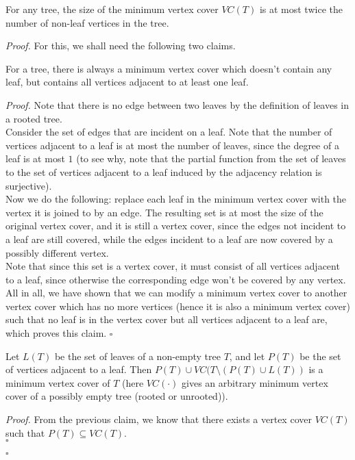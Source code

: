 \documentclass[a4paper]{article}
\newenvironment{proof}{\begin{breakbox}\textit{Proof.}}{\hfill$\square$\end{breakbox}}
\newcommand{\nl}{\vspace{0.2cm}\\}
\begin{document}
\begin{claim}
    For any tree, the size of the minimum vertex cover $VC(T)$ is at most twice the number of non-leaf vertices in the tree.
\end{claim}
\begin{proof}
    For this, we shall need the following two claims.\nl
    \begin{claim}
        For a tree, there is always a minimum vertex cover which doesn't contain any leaf, but contains all vertices adjacent to at least one leaf.
    \end{claim}
    \begin{proof}
        Note that there is no edge between two leaves by the definition of leaves in a rooted tree.\nl
        Consider the set of edges that are incident on a leaf.
        Note that the number of vertices adjacent to a leaf is at most the number of leaves, since the degree of a leaf is at most $1$ (to see why, note that the partial function from the set of
        leaves to the set of vertices adjacent to a leaf induced by the adjacency relation is surjective).\nl
        Now we do the following: replace each leaf in the minimum vertex cover with the vertex it is joined to by an edge. The resulting set is at most the size of the original vertex cover,
        and it is still a vertex cover, since the edges not incident to a leaf are still covered, while the edges incident to a leaf are now covered by a possibly different vertex.\nl
        Note that since this set is a vertex cover, it must consist of all vertices adjacent to a leaf, since otherwise the corresponding edge won't be covered by any vertex.\nl
        All in all, we have shown that we can modify a minimum vertex cover to another vertex cover which has no more vertices (hence it is also a minimum vertex cover) such that no leaf is in the
        vertex cover but all vertices adjacent to a leaf are, which proves this claim.
    \end{proof}
    \begin{claim}
        Let $L(T)$ be the set of leaves of a non-empty tree $T$, and let $P(T)$ be the set of vertices adjacent to a leaf. Then $P(T) \cup VC(T \setminus (P(T) \cup
        L(T))$ is a minimum vertex cover of $T$ (here $VC(\cdot)$ gives an arbitrary minimum vertex cover of a possibly empty tree (rooted or unrooted)).
    \end{claim}
    \begin{proof}
        From the previous claim, we know that there exists a vertex cover $VC(T)$ such that $P(T) \subseteq VC(T)$.\nl

\end{proof}
\end{proof}
\end{document}
